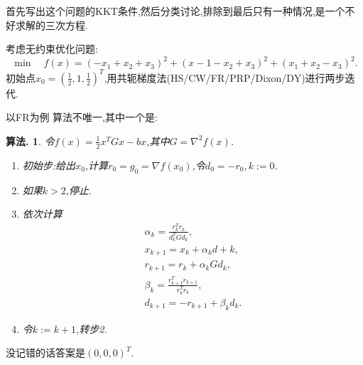 \documentclass[oneside,a4paper,12pt]{ctexbook}
\theoremstyle{nonumberplain}
\theoremstyle{nonumberplain}
\theoremstyle{nonumberplain}
\newtheorem{algorithm}{算法.}
\newcounter{task}
\newenvironment{task}[1]{
    \begin{tcolorbox}[enhanced,colback=blue!5!white,colframe=blue!60!black,colbacktitle=blue!40!gray,fonttitle=\bfseries,fontupper=\kaishu,fontlower=\kaishu,
        theorem={题}{task}{}{#1},attach boxed title to top left={xshift=2mm,yshift=-0.5mm},boxed title size=copy]
}{
    \end{tcolorbox}
}
\begin{document}
    \begin{thinking*}{}
        首先写出这个问题的KKT条件,然后分类讨论,排除到最后只有一种情况,是一个不好求解的三次方程.
    \end{thinking*}

    \begin{task}{最优化今年大题3}
        考虑无约束优化问题:
        \begin{equation*}
            \min\quad f(x)=(-x_1+x_2+x_3)^2+(x-1-x_2+x_3)^2+(x_1+x_2-x_3)^2.
        \end{equation*}
        初始点$x_0=\left(\frac{1}{2},1,\frac{1}{2}\right)^T$,用共轭梯度法(HS/CW/FR/PRP/Dixon/DY)进行两步迭代.
    \end{task}

    \begin{thinking*}{以FR为例}
        算法不唯一,其中一个是:
        \begin{algorithm}
            令$f(x)=\frac{1}{2}x^TGx-bx$,其中$G=\nabla^2f(x)$.
            \begin{enumerate}[{步}1.]
                \item 初始步:给出$x_0$,计算$r_0=g_0=\nabla f(x_0)$,令$d_0=-r_0,k:=0$.
                \item 如果$k>2$,停止.
                \item 依次计算\begin{gather*}
                    \alpha_k=\frac{r_k^Tr_k}{d_k^TGd_k},\\
                    x_{k+1}=x_k+\alpha_kd+k,\\
                    r_{k+1}=r_k+\alpha_kGd_k,\\
                    \beta_k=\frac{r_{k+1}^Tr_{k+1}}{r_k^Tr_k},\\
                    d_{k+1}=-r_{k+1}+\beta_kd_k.
                \end{gather*}
                \item 令$k:=k+1$,转步2.
            \end{enumerate}
        \end{algorithm}
        没记错的话答案是$(0,0,0)^T$.
    \end{thinking*}
\end{document}
